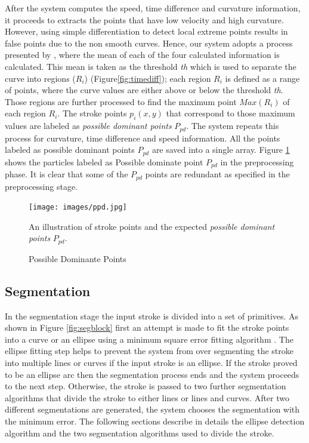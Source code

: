 \documentclass[preprint,1p,times,review]{elsarticle}
\begin{document}
After the system computes the speed, time difference and curvature information, it proceeds to extracts the points that have low velocity and high curvature. However, using simple differentiation to detect local extreme points results in false points due to the non smooth curves. Hence, our system adopts a process presented by \cite{earlyprocess}, where the mean of each of the four calculated information is calculated. This mean is taken as the threshold \textit{th} which is used to separate the curve into regions ($R_i$) (Figure\ref{fig:timediff}); each region $R_i$ is defined as a range of points, where the curve values are either above or below the threshold \textit{th}. Those regions are further processed to find the maximum point $Max(R_i)$ of each region $R_i$. The stroke points $p_i(x,y)$ that correspond to those maximum values are labeled as \textit{possible dominant points} $P_{pd}$. The system repeats this process for curvature, time difference and speed information. All the points labeled as possible dominant points $P_{pd}$ are saved into a single array. Figure \ref{fig:ppd999} shows the particles labeled as Possible dominate point $P_{pd}$ in the preprocessing phase. It is clear that some of the $P_{pd}$ points are redundant as specified in the preprocessing stage. %
\begin{figure}
	\centering
\texttt{[image: images/ppd.jpg]}
	\caption{Possible Dominante Points} An illustration of stroke points and
the expected \textit{possible dominant points} $P_{pd}$.
	\label{fig:ppd999}
\end{figure}

 
 




\subsection{Segmentation}
\label{seg} 
In the segmentation stage the input stroke is divided into a set of primitives. As shown in Figure \ref{fig:segblock} first an attempt is made to fit the stroke points into a curve or an ellipse using a minimum square error fitting algorithm \cite{ellipsefit}. The ellipse fitting step helps to prevent the system from over segmenting the stroke into multiple lines or curves if the input stroke is an ellipse. If the stroke proved to be an ellipse arc then the segmentation process ends and the system proceeds to the next step. Otherwise, the stroke is passed to two further segmentation algorithms that divide the stroke to either lines or lines and curves. After two different segmentations are generated, the system chooses the segmentation with the minimum error. The following sections describe in details the ellipse detection algorithm and the two segmentation algorithms used to divide the stroke.
\end{document}
